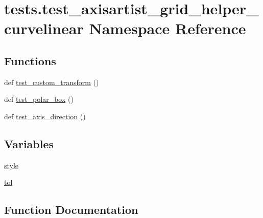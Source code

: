 \hypertarget{namespacetests_1_1test__axisartist__grid__helper__curvelinear}{}\section{tests.\+test\+\_\+axisartist\+\_\+grid\+\_\+helper\+\_\+curvelinear Namespace Reference}
\label{namespacetests_1_1test__axisartist__grid__helper__curvelinear}
\subsection*{Functions}
\begin{DoxyCompactItemize}
\item 
def \hyperlink{namespacetests_1_1test__axisartist__grid__helper__curvelinear_a53068998077a4b3a69d50d036b92a9f0}{test\+\_\+custom\+\_\+transform} ()
\item 
def \hyperlink{namespacetests_1_1test__axisartist__grid__helper__curvelinear_a79b7393d15dd9902977a88e504ca8cdb}{test\+\_\+polar\+\_\+box} ()
\item 
def \hyperlink{namespacetests_1_1test__axisartist__grid__helper__curvelinear_a0efb04c873f88d0c2b7a13a9eb32228c}{test\+\_\+axis\+\_\+direction} ()
\end{DoxyCompactItemize}
\subsection*{Variables}
\begin{DoxyCompactItemize}
\item 
\hyperlink{namespacetests_1_1test__axisartist__grid__helper__curvelinear_a87dbe1c9db98f92c530f6ceb7e8dd456}{style}
\item 
\hyperlink{namespacetests_1_1test__axisartist__grid__helper__curvelinear_a592a7f595ea536b030c6490590d6bf94}{tol}
\end{DoxyCompactItemize}


\subsection{Function Documentation}
\mbox{\label{namespacetests_1_1test__axisartist__grid__helper__curvelinear_a0efb04c873f88d0c2b7a13a9eb32228c}} 
